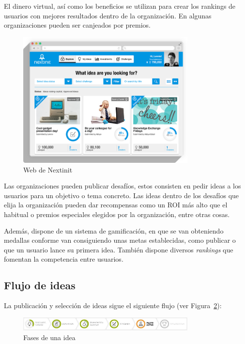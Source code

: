 El dinero virtual, así como los beneficios se utilizan para crear los rankings de usuarios con mejores resultados
dentro de la organización. En algunas organizaciones pueden ser canjeados por premios.

\begin{figure}[!h]
	\begin{center}
		\includegraphics[width=0.8\textwidth]{./img/introduccion/nextinit.png}
		\caption{Web de Nextinit}
		\label{fig:web}
	\end{center}
\end{figure}

Las organizaciones pueden publicar desafíos, estos consisten en pedir ideas a los usuarios para un 
objetivo o tema concreto. Las ideas dentro de los desafíos que elija la organización pueden dar 
recompensas como un \acs{ROI} más alto que el habitual o premios especiales elegidos
por la organización, entre otras cosas.

Además, dispone de un sistema de gamificación, en que se van obteniendo medallas conforme van
consiguiendo unas metas establecidas, como publicar o que un usuario lance su primera idea. También
dispone diversos \textit{rankings} que fomentan la competencia entre usuarios.

\subsection{Flujo de ideas}

La publicación y selección de ideas sigue el siguiente flujo (ver Figura~\ref{fig:flujo}):

\begin{figure}[!h]
	\begin{center}
		\includegraphics[width=0.8\textwidth]{./img/introduccion/flujo.png}
		\caption{Fases de una idea}
		\label{fig:flujo}
	\end{center}
\end{figure}

